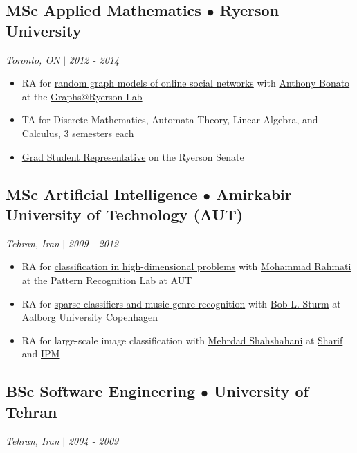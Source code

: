 \documentclass[11pt,letterpaper]{article}
\begin{document}
\subsection*{\textbf{MSc Applied Mathematics} $\bullet$ Ryerson University}
\textit{Toronto, ON} $|$ \textit{2012 - 2014}

\begin{itemize}
    \item RA for \href{https://djpardis.com/files/modeling_the_facebook_social_network.pdf}{random graph models of online social networks} with \href{https://math.ryerson.ca/~abonato/}{Anthony Bonato} at the \href{https://www.torontomu.ca/graphs-group/}{Graphs@Ryerson Lab}
    \item TA for Discrete Mathematics, Automata Theory, Linear Algebra, and Calculus, 3 semesters each
    \item \href{https://www.torontomu.ca/content/dam/senate/senate-meetings/agenda/2013/20130604agendamin.pdf}{Grad Student Representative} on the Ryerson Senate
\end{itemize}

\subsection*{\textbf{MSc Artificial Intelligence} $\bullet$ Amirkabir University of Technology (AUT)}
\textit{Tehran, Iran} $|$ \textit{2009 - 2012}

\begin{itemize}
    \item RA for \href{https://djpardis.com/files/Noorzad2012b.pdf}{classification in high-dimensional problems} with \href{https://scholar.google.com/citations?user=EYk7M80AAAAJ&hl=en}{Mohammad Rahmati} at the Pattern Recognition Lab at AUT
    \item RA for \href{https://djpardis.com/files/genreSturmNoorzad20120116.pdf}{sparse classifiers and music genre recognition} with \href{https://www.kth.se/profile/bobs}{Bob L. Sturm} at Aalborg University Copenhagen
    \item RA for large-scale image classification with \href{https://www.genealogy.math.ndsu.nodak.edu/id.php?id=32512}{Mehrdad Shahshahani} at \href{https://en.sharif.ir/}{Sharif} and \href{https://www.ipm.ac.ir/}{IPM}
\end{itemize}

\subsection*{\textbf{BSc Software Engineering} $\bullet$ University of Tehran}
\textit{Tehran, Iran} $|$ \textit{2004 - 2009}
\end{document}
